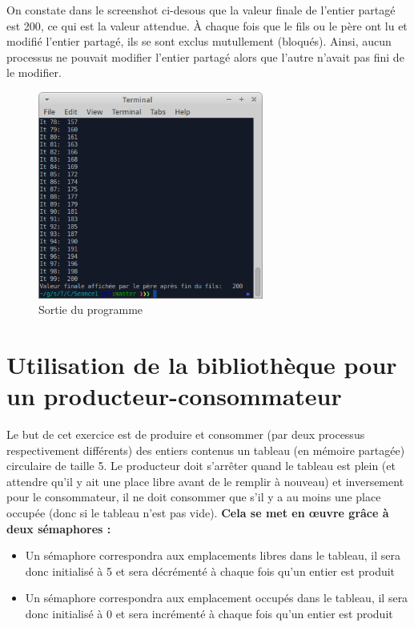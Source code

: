 On constate dans le screenshot ci-desous que la valeur finale de l'entier partagé est 200, ce qui est la valeur attendue. À chaque fois que le fils ou le père ont lu et modifié l'entier partagé, ils se sont exclus mutullement (bloqués). Ainsi, aucun processus ne pouvait modifier l'entier partagé alors que l'autre n'avait pas fini de le modifier.

\begin{figure}[h!]
  \centering
  \includegraphics[width=0.66\textwidth]{seance2_img2.png}
  \caption{Sortie du programme}
\end{figure}

\chapter{Utilisation de la bibliothèque pour un producteur-consommateur}

Le but de cet exercice est de produire et consommer (par deux processus respectivement différents) des entiers contenus un tableau (en mémoire partagée) circulaire de taille 5. Le producteur doit s'arrêter quand le tableau est plein (et attendre qu'il y ait une place libre avant de le remplir à nouveau) et inversement pour le consommateur, il ne doit \og consommer\fg{} que s'il y a au moins une place occupée (donc si le tableau n'est pas vide). \textbf{Cela se met en \oe{}uvre grâce à deux sémaphores :}
\begin{itemize}
  \item Un sémaphore correspondra aux emplacements libres dans le tableau, il sera donc initialisé à 5 et sera décrémenté à chaque fois qu'un entier est produit
  \item Un sémaphore correspondra aux emplacement occupés dans le tableau, il sera donc initialisé à 0 et sera incrémenté à chaque fois qu'un entier est produit
\end{itemize}

